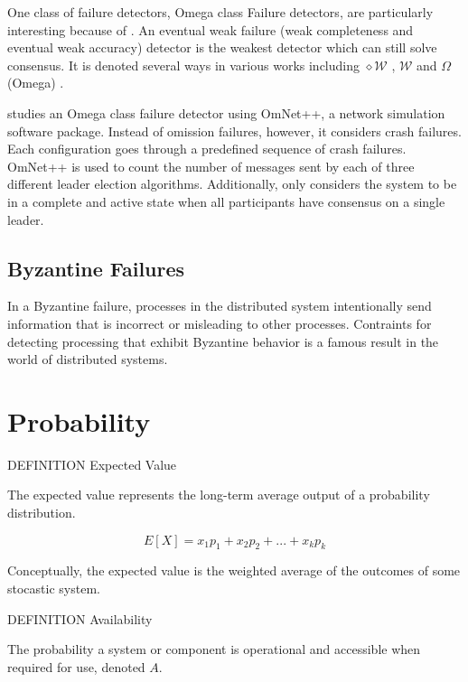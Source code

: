 One class of failure detectors, Omega class Failure detectors, are particularly interesting because of \cite{LEADERELECTIONEVAL}. An eventual weak failure (weak completeness and eventual weak accuracy) detector is the weakest detector which can still solve consensus. It is denoted several ways in various works including $\diamond \mathcal{W}$ \cite{FAILUREDETECTORS}, $\mathcal{W}$ \cite{WEAKESTFAILURE1} \cite{WEAKESTFAILURE2} and $\Omega$ (Omega) \cite{LEADERELECTIONEVAL}.

\cite{LEADERELECTIONEVAL} studies an Omega class failure detector using OmNet++\cite{OMNET}, a network simulation software package. Instead of omission failures, however, it considers crash failures. Each configuration goes through a predefined sequence of crash failures. OmNet++ is used to count the number of messages sent by each of three different leader election algorithms. Additionally, \cite{LEADERELECTIONEVAL} only considers the system to be in a complete and active state when all participants have consensus on a single leader.

\subsection{Byzantine Failures}

In a Byzantine failure, processes in the distributed system intentionally send information that is incorrect or misleading to other processes.
Contraints for detecting processing that exhibit Byzantine behavior is a famous result in the world of distributed systems.

\section{Probability}

DEFINITION Expected Value

The expected value represents the long-term average output of a probability distribution.

\begin{equation}E[X] = x_1 p_1 + x_2 p_2 + ... + x_k p_k \end{equation}

Conceptually, the expected value is the weighted average of the outcomes of some stocastic system.

DEFINITION Availability

The probability a system or component is operational and accessible when required for use, denoted $A$.

